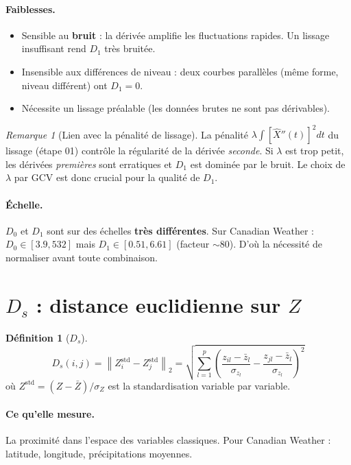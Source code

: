 \documentclass[11pt, a4paper]{article}
\theoremstyle{definition}
\newtheorem{definition}{Définition}[section]
\theoremstyle{remark}
\newtheorem{remarque}{Remarque}[section]
\begin{document}
\paragraph{Faiblesses.}
\begin{itemize}[nosep]
  \item Sensible au \textbf{bruit} : la dérivée amplifie les fluctuations
    rapides. Un lissage insuffisant rend $D_1$ très bruitée.
  \item Insensible aux différences de niveau : deux courbes parallèles
    (même forme, niveau différent) ont $D_1 = 0$.
  \item Nécessite un lissage préalable (les données brutes ne sont pas
    dérivables).
\end{itemize}

\begin{remarque}[Lien avec la pénalité de lissage]
La pénalité $\lambda \int [\hat{X}''(t)]^2 dt$ du lissage (étape 01)
contrôle la régularité de la dérivée \emph{seconde}. Si $\lambda$ est trop
petit, les dérivées \emph{premières} sont erratiques et $D_1$ est dominée
par le bruit. Le choix de $\lambda$ par GCV est donc crucial pour la qualité
de $D_1$.
\end{remarque}

\paragraph{Échelle.}
$D_0$ et $D_1$ sont sur des échelles \textbf{très différentes}. Sur Canadian
Weather : $D_0 \in [3.9, 532]$ mais $D_1 \in [0.51, 6.61]$ (facteur
$\sim\!80$). D'où la nécessité de normaliser avant toute combinaison.

\section{$D_s$ : distance euclidienne sur $Z$}

\begin{definition}[$D_s$]
\[
  D_s(i,j) = \left\| Z_i^{\text{std}} - Z_j^{\text{std}} \right\|_2
  = \sqrt{\sum_{l=1}^{p} \left( \frac{z_{il} - \bar{z}_l}{\sigma_{z_l}}
    - \frac{z_{jl} - \bar{z}_l}{\sigma_{z_l}} \right)^2}
\]
où $Z^{\text{std}} = (Z - \bar{Z}) / \sigma_Z$ est la standardisation
variable par variable.
\end{definition}

\paragraph{Ce qu'elle mesure.}
La proximité dans l'espace des variables classiques. Pour Canadian Weather :
latitude, longitude, précipitations moyennes.
\end{document}
